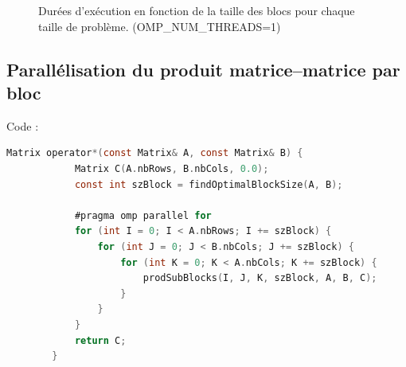 \documentclass[a4paper,13pt]{book}
\begin{document}
        \begin{figure}[ht]
            \centering
            \caption{Durées d'exécution en fonction de la taille des blocs pour chaque taille de problème. (OMP\_NUM\_THREADS=1)}
            \label{fig:execution_time}
        \end{figure}
\subsection{Parallélisation du produit matrice–matrice par bloc}
Code :  \\

	\begin{lstlisting}[language=C]
        Matrix operator*(const Matrix& A, const Matrix& B) {
            Matrix C(A.nbRows, B.nbCols, 0.0);
            const int szBlock = findOptimalBlockSize(A, B);
        
            #pragma omp parallel for
            for (int I = 0; I < A.nbRows; I += szBlock) {
                for (int J = 0; J < B.nbCols; J += szBlock) {
                    for (int K = 0; K < A.nbCols; K += szBlock) {
                        prodSubBlocks(I, J, K, szBlock, A, B, C);
                    }
                }
            }
            return C;
        }
\end{lstlisting}
\end{document}
